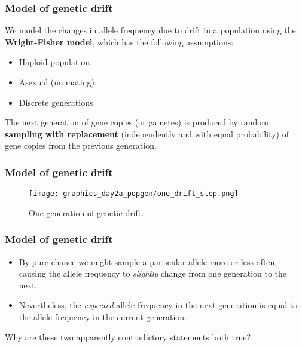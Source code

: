 \documentclass{beamer}
\newcommand{\1}{\ensuremath{\mathbf{1}}}
\begin{document}
%
%
%
\begin{frame}\frametitle{Model of genetic drift}
	We model the changes in allele frequency due to drift in a population using the \textbf{Wright-Fisher model}, which has the following assumptions:
	\begin{itemize}
		\item Haploid population.
		\item Asexual (no mating).
		\item Discrete generations.
	\end{itemize}
	\begin{block}{}
		The next generation of gene copies (or gametes) is produced by random \textbf{sampling with replacement} (independently and with equal probability) of gene copies from the previous generation.
	\end{block}
\end{frame}
%
%
%
\begin{frame}\frametitle{Model of genetic drift}
	\begin{figure}
	\begin{center}
		\texttt{[image: graphics\_day2a\_popgen/one\_drift\_step.png]}
	\end{center}
	\caption{One generation of genetic drift.}
	\end{figure}
\end{frame}
%
%
%
\begin{frame}\frametitle{Model of genetic drift}
	\begin{itemize}
		\item By pure chance we might sample a particular allele more or less often, causing the allele frequency to \emph{slightly} change from one generation to the next.
		\item Nevertheless, the \emph{expected} allele frequency in the next generation is equal to the allele frequency in the current generation.
	\end{itemize}
	\vspace{2ex}Why are these two apparently contradictory statements both true?
\end{frame}
\end{document}
